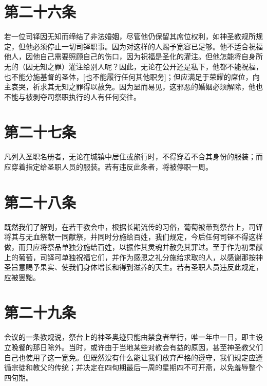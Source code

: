 \section{第二十六条}

若一位司铎因无知而缔结了非法婚姻，尽管他仍保留其席位权利，如神圣教规所规定，但他必须停止一切司铎职事。因为对这样的人赐予宽容已足够。他不适合祝福他人，因他自己需要照顾自己的伤口，因为祝福是圣化的灌注。但他怎能将自身所无的（因无知之罪）灌注给别人呢？因此，无论在公开还是私下，他都不能祝福，也不能分施基督的圣体，[也不能履行任何其他职务]；但应满足于荣耀的席位，向主哀哭，祈求其无知之罪得以赦免。因为显而易见，这邪恶的婚姻必须解除，他也不能与被剥夺司祭职执行的人有任何交往。\par


\section{第二十七条}

凡列入圣职名册者，无论在城镇中居住或旅行时，不得穿着不合其身份的服装；而应穿着指定给圣职人员的服装。若有违反此条者，将被停职一周。\par


\section{第二十八条}

既然我们了解到，在若干教会中，根据长期流传的习俗，葡萄被带到祭台上，司铎将其与无血祭献一同献祭，并同时分施给百姓，我们规定，今后任何司铎不得这样做，而只应将祭品单独分施给百姓，以振作其灵魂并赦免其罪过。至于作为初果献上的葡萄，司铎可单独祝福它们，并作为感恩之礼分施给求取的人，以感谢那按神圣旨意赐予果实、使我们身体增长和得到滋养的天主。若有圣职人员违反此规定，应被罢黜。\par


\section{第二十九条}

会议的一条教规说，祭台上的神圣奥迹只能由禁食者举行，唯一年中一日，即主设立晚餐的那日除外。当时，或许由于当地某些对教会有益的原因，甚至神圣教父们自己也使用了这一宽免。但既然没有什么能让我们放弃严格的遵守，我们规定应遵循宗徒和教父的传统；并决定在四旬期最后一周的星期四不可开斋，以免羞辱整个四旬期。\par


